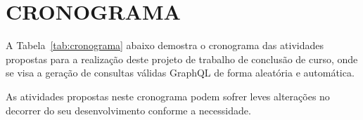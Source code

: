 \chapter{CRONOGRAMA}
\label{chap:cronograma}
A Tabela~\ref{tab:cronograma} abaixo demostra o cronograma das atividades propostas para a realização deste projeto de trabalho de conclusão de curso, onde se visa a geração de consultas válidas GraphQL de forma aleatória e automática.

\begin{table}[H]
\centering
{}
\caption{Cronograma previsto para as atividades propostas.}
\label{tab:cronograma}
\end{table}

As atividades propostas neste cronograma podem sofrer leves alterações no decorrer do seu desenvolvimento conforme a necessidade.

